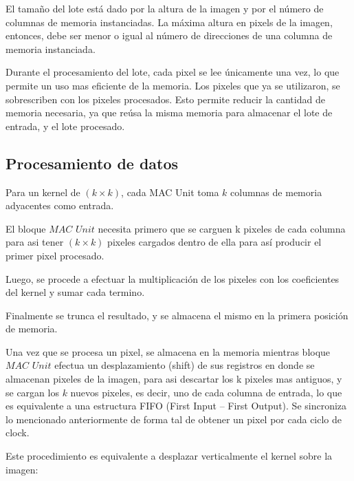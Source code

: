 El tamaño del lote está dado por la altura de la imagen y por el número de
columnas de memoria instanciadas.  La máxima altura en pixels de la imagen,
entonces, debe ser menor o igual al número de direcciones de una columna de
memoria instanciada.

Durante el procesamiento del lote, cada pixel se lee únicamente una vez, lo que permite un uso mas eficiente de la memoria. Los pixeles que ya se utilizaron, se sobrescriben con los pixeles procesados. 
Esto permite reducir la cantidad de memoria necesaria, ya que reúsa la misma memoria para almacenar el lote de entrada, y el lote procesado.

\subsection{Procesamiento de datos}  \label{processing_subsecc}
Para un kernel de  $(k \times k)$, cada MAC Unit toma $k$ columnas de memoria
adyacentes como entrada.

El bloque $MAC$  $Unit$ necesita primero que se carguen k pixeles de cada
columna para asi tener $(k \times k)$ pixeles cargados dentro de ella para así
producir el primer pixel procesado.

Luego, se procede a efectuar la multiplicación de los pixeles con los coeficientes del kernel y sumar cada termino.

Finalmente se trunca el resultado, y se almacena el mismo en la primera posición de memoria.

Una vez que se procesa un pixel, se almacena en la memoria mientras bloque $MAC$  $Unit$ efectua un desplazamiento (shift) de sus registros en donde se almacenan pixeles de la imagen, para asi descartar los k pixeles mas antiguos,
 y se cargan los $k$ nuevos pixeles, es decir, uno de cada columna de entrada, lo que es equivalente a una estructura FIFO (First Input – First Output).
Se sincroniza lo mencionado anteriormente de forma tal de obtener un pixel por cada ciclo de clock.

Este procedimiento es equivalente a desplazar verticalmente el kernel sobre la imagen:

